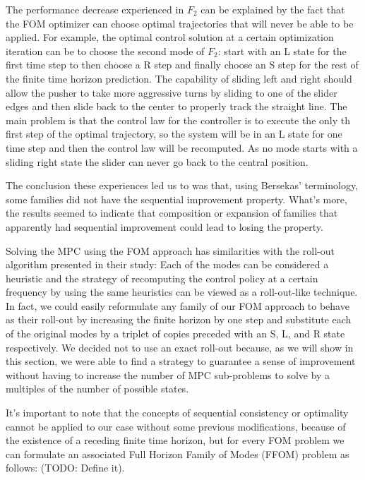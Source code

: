 \documentclass[12,twoside]{TFG-GM}
\theoremstyle{definition}
\theoremstyle{remark}
\begin{document}
The performance decrease experienced in $F_2$ can be explained by the fact that the FOM optimizer can choose optimal trajectories that will never be able to be applied. For example, the optimal control solution at a certain optimization iteration can be to choose the second mode of $F_2$: start with an L state for the first time step to then choose a R step and finally choose an S step for the rest of the finite time horizon prediction. The capability of sliding left and right should allow the pusher to take more aggressive turns by sliding to one of the slider edges and then slide back to the center to properly track the straight line. The main problem is that the control law for the controller is to execute the only th first step of the optimal trajectory, so the system will be in an L state for one time step and then the control law will be recomputed. As no mode starts with a sliding right state the slider can never go back to the central position.

The conclusion these experiences led us to was that, using Bersekas' terminology, some families did not have the sequential improvement property. What's more, the results seemed to indicate that composition or expansion of families that apparently had sequential improvement could lead to losing the property.

Solving the MPC using the FOM approach has similarities with the roll-out algorithm presented in their study: Each of the modes can be considered a heuristic and the strategy of recomputing the control policy at a certain frequency by using the same heuristics can be viewed as a roll-out-like technique. In fact, we could easily reformulate any family of our FOM approach to behave as their roll-out by increasing the finite horizon by one step and substitute each of the original modes by a triplet of copies preceded with an S, L, and R state respectively. We decided not to use an exact roll-out because, as we will show in this section, we were able to find a strategy to guarantee a sense of improvement without having to increase the number of MPC sub-problems to solve by a multiples of the number of possible states.

It's important to note that the concepts of sequential consistency or optimality cannot be applied to our case without some previous modifications, because of the existence of a receding finite time horizon, but for every FOM problem we can formulate an associated Full Horizon Family of Modes (FFOM) problem as follows: (TODO: Define it).
\end{document}
